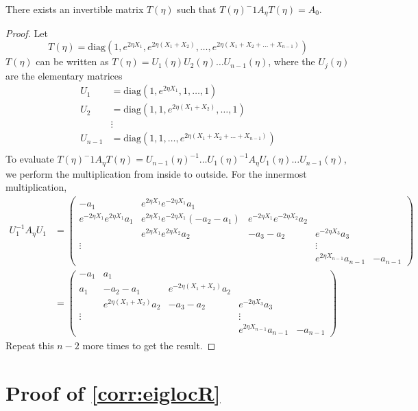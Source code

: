 \documentclass[thesis.tex]{subfiles}
\begin{document}
\begin{lemma}\label{lemma:Aetaconj}
There exists an invertible matrix $T(\eta)$ such that $T(\eta)^-1 A_\eta T(\eta) = A_0$.
\begin{proof}
Let 
\[
T(\eta) = \text{diag}(1, e^{2 \eta X_1}, e^{2 \eta (X_1 + X_2)}, \dots, e^{2 \eta (X_1 + X_2 + \dots + X_{n-1})})
\]
$T(\eta)$ can be written as $T(\eta) = U_1(\eta) U_2(\eta) \dots U_{n-1}(\eta)$, where the $U_j(\eta)$ are the elementary matrices
\begin{align*}
U_1 &= \text{diag}(1, e^{2 \eta X_1}, 1, \dots, 1) \\
U_2 &= \text{diag}(1, 1, e^{2 \eta (X_1 + X_2)}, \dots, 1) \\
&\vdots \\
U_{n-1} &= \text{diag}(1, 1, \dots, e^{2 \eta (X_1 + X_2 + \dots + X_{n-1})}) \\
\end{align*}
To evaluate $T(\eta)^-1 A_\eta T(\eta) = U_{n-1}(\eta)^{-1} \dots U_1(\eta)^{-1} A_\eta U_1(\eta) \dots U_{n-1}(\eta)$, we perform the multiplication from inside to outside. For the innermost multiplication,
\begin{align*}
U_1^{-1} A_\eta U_1 &= \begin{pmatrix}
-a_1 & e^{2 \eta X_1} e^{-2 \eta X_1} a_1 \\
e^{-2 \eta X_1} e^{2 \eta X_1} a_1 & e^{2 \eta X_1} e^{-2 \eta X_1}(-a_2 - a_1) & e^{-2 \eta X_1}e^{-2 \eta X_2} a_2 \\
& e^{2 \eta X_1} e^{2 \eta X_2} a_2 & -a_3 - a_2 & e^{-2 \eta X_3} a_3 \\
\vdots & & & \vdots \\
& & & e^{2 \eta X_{n-1}} a_{n-1} & -a_{n-1} 
\end{pmatrix}\\
&= \begin{pmatrix}
-a_1 & a_1 \\
a_1 & -a_2 - a_1 & e^{-2 \eta (X_1+X_2)} a_2 \\
& e^{2 \eta (X_1+X_2)} a_2 & -a_3 - a_2 & e^{-2 \eta X_3} a_3 \\
\vdots & & & \vdots \\
& & & e^{2 \eta X_{n-1}} a_{n-1} & -a_{n-1} 
\end{pmatrix}
\end{align*}
Repeat this $n-2$ more times to get the result.
\end{proof}
\end{lemma}

\section{Proof of \cref{corr:eiglocR}}
\end{document}
